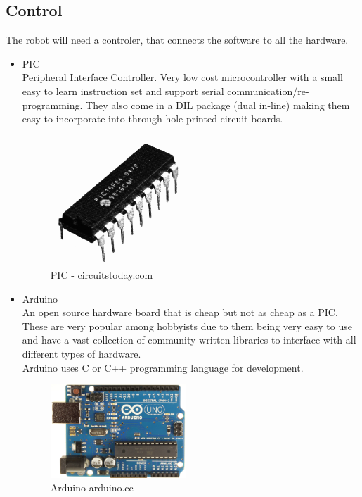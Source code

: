 \subsection{Control}
The robot will need a controler, that connects the software to all the hardware.
\begin{itemize}
\item PIC
\\Peripheral Interface Controller.  Very low cost microcontroller with a small easy to learn instruction set and support serial communication/re-programming.  They also come in a DIL package (dual in-line) making them easy to incorporate into through-hole printed circuit boards.
\begin{figure}[h]
\centering
        \includegraphics[width=2.0in] {Images/pic-chip.png}
        \caption{PIC - circuitstoday.com}
        \label{PIC}
\end{figure}

\item Arduino
\\An open source hardware board that is cheap but not as cheap as a PIC.  These are very popular among hobbyists due to them being very easy to use and have a vast collection of community written libraries to interface with all different types of hardware.
\\Arduino uses C or C++ programming language for development.
\begin{figure}[h]
\centering
        \includegraphics[width=2.0in] {Images/arduinouno-r3.jpg}
        \caption{Arduino arduino.cc}
        \label{Arduino}
\end{figure}


\end{itemize}
